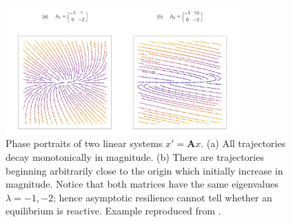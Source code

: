 \begin{figure}[ht]
	\centering
	\captionsetup{width=0.8\linewidth}
	\includegraphics[width=0.8\textwidth]{figs/positive_reactivity_real_example}
	\caption{Phase portraits of two linear systems $x' = \textbf{A}x$. (a) All trajectories decay monotonically in magnitude. (b) There are trajectories beginning arbitrarily close to the origin which initially increase in magnitude. Notice that both matrices have the same eigenvalues $\lambda = -1, -2$; hence asymptotic resilience cannot tell whether an equilibrium is reactive. Example reproduced from \cite{neubertAlternativesResilienceMeasuring1997}.}
	
	\label{fig:reactivity}
\end{figure} 